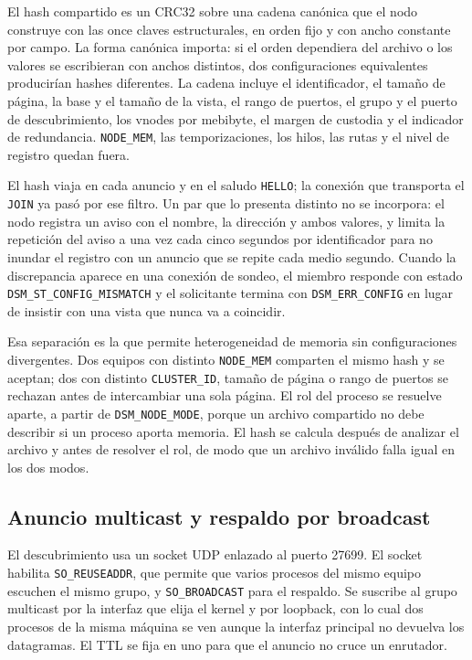 El hash compartido es un CRC32 sobre una cadena canónica que el nodo construye con las once claves estructurales, en orden fijo y con ancho constante por campo. La forma canónica importa: si el orden dependiera del archivo o los valores se escribieran con anchos distintos, dos configuraciones equivalentes producirían hashes diferentes. La cadena incluye el identificador, el tamaño de página, la base y el tamaño de la vista, el rango de puertos, el grupo y el puerto de descubrimiento, los vnodes por mebibyte, el margen de custodia y el indicador de redundancia. \texttt{NODE\_MEM}, las temporizaciones, los hilos, las rutas y el nivel de registro quedan fuera.

El hash viaja en cada anuncio y en el saludo \texttt{HELLO}; la conexión que transporta el \texttt{JOIN} ya pasó por ese filtro. Un par que lo presenta distinto no se incorpora: el nodo registra un aviso con el nombre, la dirección y ambos valores, y limita la repetición del aviso a una vez cada cinco segundos por identificador para no inundar el registro con un anuncio que se repite cada medio segundo. Cuando la discrepancia aparece en una conexión de sondeo, el miembro responde con estado \texttt{DSM\_ST\_CONFIG\_MISMATCH} y el solicitante termina con \texttt{DSM\_ERR\_CONFIG} en lugar de insistir con una vista que nunca va a coincidir.

Esa separación es la que permite heterogeneidad de memoria sin configuraciones divergentes. Dos equipos con distinto \texttt{NODE\_MEM} comparten el mismo hash y se aceptan; dos con distinto \texttt{CLUSTER\_ID}, tamaño de página o rango de puertos se rechazan antes de intercambiar una sola página. El rol del proceso se resuelve aparte, a partir de \texttt{DSM\_NODE\_MODE}, porque un archivo compartido no debe describir si un proceso aporta memoria. El hash se calcula después de analizar el archivo y antes de resolver el rol, de modo que un archivo inválido falla igual en los dos modos.

\subsection{Anuncio multicast y respaldo por broadcast}

El descubrimiento usa un socket UDP enlazado al puerto 27699. El socket habilita \texttt{SO\_REUSEADDR}, que permite que varios procesos del mismo equipo escuchen el mismo grupo, y \texttt{SO\_BROADCAST} para el respaldo. Se suscribe al grupo multicast por la interfaz que elija el kernel y por loopback, con lo cual dos procesos de la misma máquina se ven aunque la interfaz principal no devuelva los datagramas. El TTL se fija en uno para que el anuncio no cruce un enrutador.

